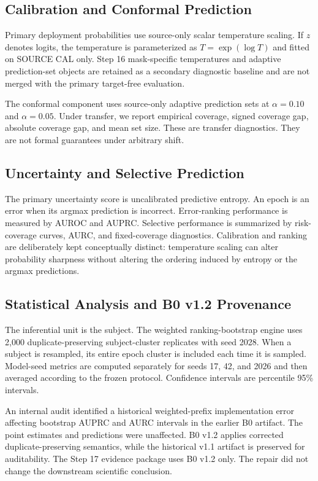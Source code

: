 \documentclass[11pt]{article}
\begin{document}
\subsection{Calibration and Conformal Prediction}
Primary deployment probabilities use source-only scalar temperature scaling. If $z$ denotes logits, the temperature is parameterized as $T=\exp(\log T)$ and fitted on SOURCE CAL only. Step 16 mask-specific temperatures and adaptive prediction-set objects are retained as a secondary diagnostic baseline and are not merged with the primary target-free evaluation.

The conformal component uses source-only adaptive prediction sets at $\alpha=0.10$ and $\alpha=0.05$. Under transfer, we report empirical coverage, signed coverage gap, absolute coverage gap, and mean set size. These are transfer diagnostics. They are not formal guarantees under arbitrary shift.

\subsection{Uncertainty and Selective Prediction}
The primary uncertainty score is uncalibrated predictive entropy. An epoch is an error when its argmax prediction is incorrect. Error-ranking performance is measured by AUROC and AUPRC. Selective performance is summarized by risk-coverage curves, AURC, and fixed-coverage diagnostics. Calibration and ranking are deliberately kept conceptually distinct: temperature scaling can alter probability sharpness without altering the ordering induced by entropy or the argmax predictions.

\subsection{Statistical Analysis and B0 v1.2 Provenance}
The inferential unit is the subject. The weighted ranking-bootstrap engine uses 2,000 duplicate-preserving subject-cluster replicates with seed 2028. When a subject is resampled, its entire epoch cluster is included each time it is sampled. Model-seed metrics are computed separately for seeds 17, 42, and 2026 and then averaged according to the frozen protocol. Confidence intervals are percentile 95\% intervals.

An internal audit identified a historical weighted-prefix implementation error affecting bootstrap AUPRC and AURC intervals in the earlier B0 artifact. The point estimates and predictions were unaffected. B0 v1.2 applies corrected duplicate-preserving semantics, while the historical v1.1 artifact is preserved for auditability. The Step 17 evidence package uses B0 v1.2 only. The repair did not change the downstream scientific conclusion.
\end{document}
